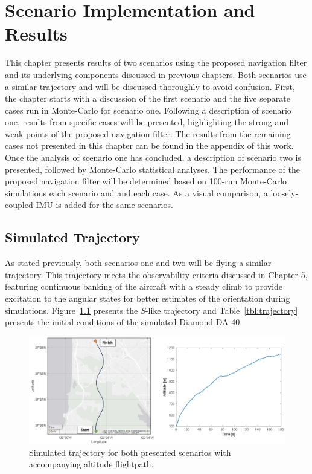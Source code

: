 \chapter{Scenario Implementation and Results}
This chapter presents results of two scenarios using the proposed navigation filter and its underlying components discussed in previous chapters. Both scenarios use a similar trajectory and will be discussed thoroughly to avoid confusion. First, the chapter starts with a discussion of the first scenario and the five separate cases run in Monte-Carlo for scenario one. Following a description of scenario one, results from specific cases will be presented, highlighting the strong and weak points of the proposed navigation filter. The results from the remaining cases not presented in this chapter can be found in the appendix of this work. Once the analysis of scenario one has concluded, a description of scenario two is presented, followed by Monte-Carlo statistical analyses. The performance of the proposed navigation filter will be determined based on 100-run Monte-Carlo simulations each scenario and and each case. As a visual comparison, a loosely-coupled IMU is added for the same scenarios.
\section{\textbf{Simulated Trajectory}}
As stated previously, both scenarios one and two will be flying a similar trajectory. This trajectory meets the observability criteria discussed in Chapter 5, featuring continuous banking of the aircraft with a steady climb to provide excitation to the angular states for better estimates of the orientation during simulations. Figure~\ref{fig:trajectory} presents the \textit{S}-like trajectory and Table~\ref{tbl:trajectory} presents the initial conditions of the simulated Diamond DA-40.

\begin{figure}[!ht]
    \centering
    \includegraphics[width=\linewidth]{Figures/trajectoryfigure.png}
    \caption{Simulated trajectory for both presented scenarios with accompanying altitude flightpath. }\label{fig:trajectory}
\end{figure}

